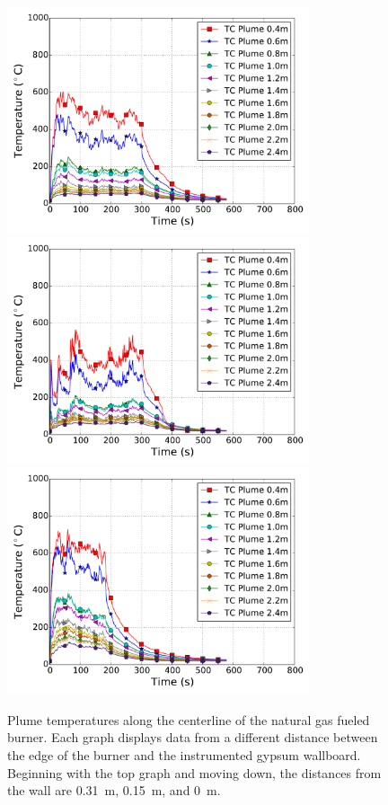 \documentclass[twoside]{uocthesis}
\begin{document}
\begin{figure}[p]
	\centering
	\includegraphics[width=3.5in]{../Figures/IWGBNG01_TC_Plume_Avg}\\
	\includegraphics[width=3.5in]{../Figures/IWGBNG04_TC_Plume_Avg}\\
	\includegraphics[width=3.5in]{../Figures/IWGBNG05_TC_Plume_Avg}\\
	\caption[Plume temperatures for the natural gas fueled burner]{Plume temperatures along the centerline of the natural gas fueled burner.    Each graph displays data from a different distance between the edge of the burner and the instrumented gypsum wallboard.  Beginning with the top graph and moving down, the distances from the wall are 0.31~m, 0.15~m, and 0~m.}
	\label{IWGB_NG_TC_Plume_set}
\end{figure}
\end{document}
